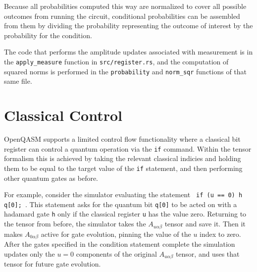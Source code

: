 \documentclass[%
 reprint,
 amsmath,amssymb,
 aps,
]{revtex4-2}
\begin{document}
Because all probabilities computed this way are normalized to cover all possible outcomes from running the circuit, conditional probabilities can be assembled from them by dividing the probability representing the outcome of interest by the probability for the condition. 

The code that performs the amplitude updates associated with measurement is in the \texttt{apply\_measure} function in \texttt{src/register.rs}, and the computation of squared norms is performed in the \texttt{probability} and \texttt{norm\_sqr}  functions of that same file.

\section{\label{sec:level1} Classical Control}
OpenQASM supports a limited control flow functionality where a classical bit register can control a quantum operation via the \texttt{if} command. Within the tensor formalism this is achieved by taking the relevant classical indicies and holding them to be equal to the target value of the \texttt{if} statement, and then performing other quantum gates as before.

For example, consider the simulator evaluating the statement \texttt{ if (u == 0) h q[0]; }. This statement asks for the quantum bit \texttt{q[0]} to be acted on with a hadamard gate \texttt{h} only if the classical register \texttt{u} has the value zero. Returning to the tensor from before, the simulator takes the $A_{u\alpha\beta}$ tensor and save it. Then it makes $A_{0\alpha\beta}$ active for gate evolution, pinning the value of the $u$ index to zero. After the gates specified in the condition statement complete the simulation updates only the $u=0$ components of the original $A_{u\alpha\beta}$ tensor, and uses that tensor for future gate evolution.

\nocite{*}

\end{document}
